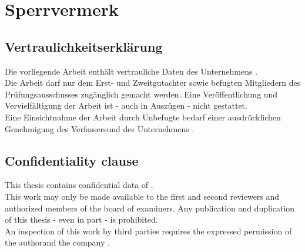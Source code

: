 \chapter*{Sperrvermerk}
\section*{Vertraulichkeitserklärung}
Die vorliegende Arbeit enthält vertrauliche Daten des Unternehmens \ifdefined\company \company \fi{}.\\

Die Arbeit darf nur dem Erst- und Zweitgutachter sowie befugten Mitgliedern des Prüfungsausschusses zugänglich gemacht werden. Eine Veröffentlichung und Vervielfältigung der Arbeit ist - auch in Auszügen - nicht gestattet.\\

Eine Einsichtnahme der Arbeit durch Unbefugte bedarf einer ausdrücklichen Genehmigung des Verfassers\ifdefined\company \;und des Unternehmens \glqq \company\grqq{} \fi{}.

\vfill\vfill\vfill\vfill\vfill\vfill

\section*{Confidentiality clause}
This thesis contains confidential data of \ifdefined\company \company \fi{}.\\

This work may only be made available to the first and second reviewers and authorized members of the board of examiners. Any publication and duplication of this thesis - even in part - is prohibited.\\

An inspection of this work by third parties requires the expressed permission of  the author\ifdefined\company \;and the company \glqq \company\grqq{} \fi{}.

\vfill\vfill\vfill\vfill\vfill\vfill